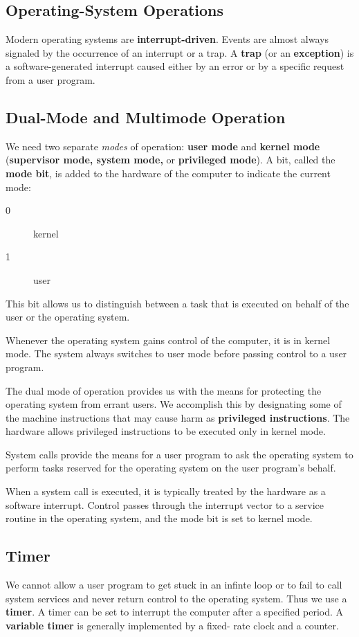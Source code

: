\documentclass[]{article}
\begin{document}
\subsection*{Operating-System Operations}
Modern operating systems are \textbf{interrupt-driven}. Events are almost always
signaled by the occurrence of an interrupt or a trap. A \textbf{trap} (or an
\textbf{exception}) is a software-generated interrupt caused either by an error
or by a specific request from a user program.

\subsection*{Dual-Mode and Multimode Operation}
We need two separate \emph{modes} of operation: \textbf{user mode} and
\textbf{kernel mode} (\textbf{supervisor mode, system mode,} or
\textbf{privileged mode}). A bit, called the \textbf{mode bit}, is added to the
hardware of the computer to indicate the current mode:
\begin{description}
\item[0] kernel
\item[1] user
\end{description}
This bit allows us to distinguish between a task that is executed on behalf of
the user or the operating system.

Whenever the operating system gains control of the computer, it is in kernel
mode. The system always switches to user mode before passing control to a user
program.

The dual mode of operation provides us with the means for protecting the
operating system from errant users. We accomplish this by designating some of
the machine instructions that may cause harm as \textbf{privileged
instructions}. The hardware allows privileged instructions to be executed only
in kernel mode.

System calls provide the means for a user program to ask the operating system to
perform tasks reserved for the operating system on the user program's behalf.

When a system call is executed, it is typically treated by the hardware as a
software interrupt. Control passes through the interrupt vector to a service
routine in the operating system, and the mode bit is set to kernel mode.

\subsection*{Timer}
We cannot allow a user program to get stuck in an infinte loop or to fail to
call system services and never return control to the operating system.  Thus we
use a \textbf{timer}. A timer can be set to interrupt the computer after a
specified period. A \textbf{variable timer} is generally implemented by a fixed-
rate clock and a counter.
\end{document}
